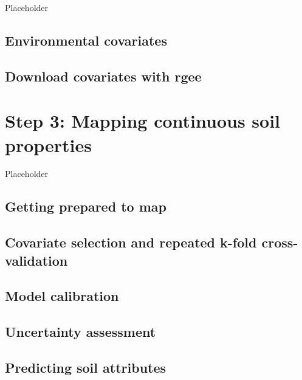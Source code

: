 \documentclass[
  10pt,
  b5paper,
  oneside]{book}
\begin{document}
Placeholder

\hypertarget{environmental-covariates-1}{%
\section{Environmental covariates}\label{environmental-covariates-1}}

\hypertarget{download-covariates-with-rgee}{%
\section{Download covariates with rgee}\label{download-covariates-with-rgee}}

\hypertarget{step-3-mapping-continuous-soil-properties}{%
\chapter{Step 3: Mapping continuous soil properties}\label{step-3-mapping-continuous-soil-properties}}

Placeholder

\hypertarget{getting-prepared-to-map}{%
\section{Getting prepared to map}\label{getting-prepared-to-map}}

\hypertarget{covariate-selection-and-repeated-k-fold-cross-validation}{%
\section{Covariate selection and repeated k-fold cross-validation}\label{covariate-selection-and-repeated-k-fold-cross-validation}}

\hypertarget{model-calibration}{%
\section{Model calibration}\label{model-calibration}}

\hypertarget{uncertainty-assessment}{%
\section{Uncertainty assessment}\label{uncertainty-assessment}}

\hypertarget{predicting-soil-attributes}{%
\section{Predicting soil attributes}\label{predicting-soil-attributes}}
\end{document}
